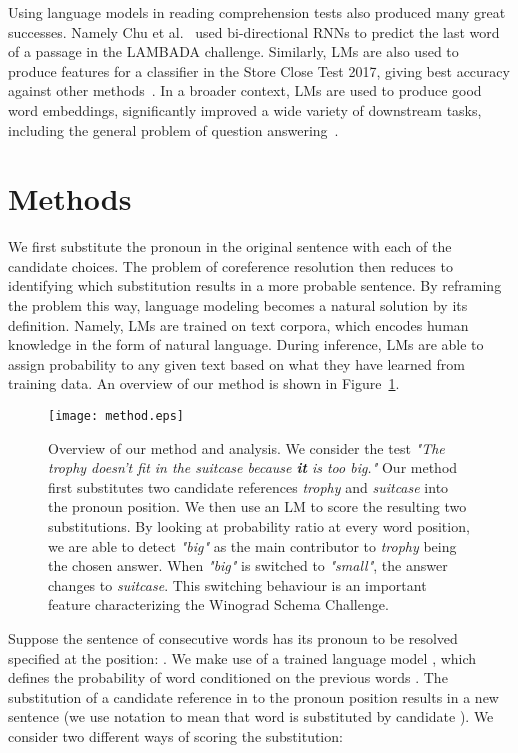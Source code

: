\documentclass{article}
\begin{document}
Using language models in reading comprehension tests also produced many great successes. Namely Chu et al.~\cite{ChuLM16} used bi-directional RNNs to predict the last word of a passage in the LAMBADA challenge. Similarly, LMs are also used to produce features for a classifier in the Store Close Test 2017, giving best accuracy against other methods~\cite{mostafazadeh2017lsdsem}. In a broader context, LMs are used to produce good word embeddings, significantly improved a wide variety of downstream tasks, including the general problem of question answering~\cite{peters2018deep,yu2018qanet}.

\section{Methods}

We first substitute the pronoun in the original sentence with each of the candidate choices. The problem of coreference resolution then reduces to identifying which substitution results in a more probable sentence. By reframing the problem this way, language modeling becomes a natural solution by its definition. Namely, LMs are trained on text corpora, which encodes human knowledge in the form of natural language. During inference, LMs are able to assign probability to any given text based on what they have learned from training data. An overview of our method is shown in Figure~\ref{fig:method}. 

\begin{figure}[t!]
\centering\small
\texttt{[image: method.eps]}
\caption{Overview of our method and analysis. We consider the test {\it "The trophy doesn't fit in the suitcase because \textbf{it} is too big."} Our method first substitutes two candidate references {\it trophy} and {\it suitcase} into the pronoun position. We then use an LM to score the resulting two substitutions. By looking at probability ratio at every word position, we are able to detect {\it "big"} as the main contributor to {\it trophy} being the chosen answer. When {\it "big"} is switched to {\it "small"}, the answer changes to {\it suitcase}. This switching behaviour is an important feature characterizing the Winograd Schema Challenge.}
\label{fig:method}
\end{figure}




Suppose the sentence  of  consecutive words has its pronoun to be resolved specified at the  position: . We make use of a trained language model , which defines the probability of word  conditioned on the previous words .  The substitution of a candidate reference  in to the pronoun position  results in a new sentence  (we use notation  to mean that word  is substituted by candidate ). We consider two different ways of scoring the substitution:
\end{document}
